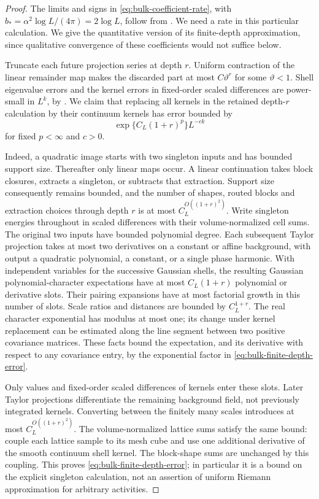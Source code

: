 \begin{proof}
The limits and signs in \eqref{eq:bulk-coefficient-rate}, with
$b_*=\alpha^2\log L/(4\pi)=2\log L$, follow from
\cite[Proposition 8.5 and Equation
(8.21)]{B}.  We need a rate in this particular
calculation.  We give the quantitative version of its finite-depth
approximation, since qualitative convergence of these coefficients
would not suffice below.

Truncate each future projection series at depth $r$.  Uniform
contraction of the linear remainder map makes the discarded part
at most $C\vartheta^r$ for some $\vartheta<1$.  Shell eigenvalue
errors and the kernel errors in fixed-order scaled differences are
power-small in $L^k$, by \cite[Lemma 8.1 and Equation
(8.9)]{B}.  We claim that replacing all kernels in
the retained depth-$r$ calculation by their continuum kernels has
error bounded by
\begin{equation}\label{eq:bulk-finite-depth-error}
 \exp\{C_L(1+r)^p\}L^{-ck}
\end{equation}
for fixed $p<\infty$ and $c>0$.

Indeed, a quadratic image starts with two singleton inputs and has
bounded support size.  Thereafter only linear maps occur.  A linear
continuation takes block closures, extracts a singleton, or
subtracts that extraction.  Support size consequently remains
bounded, and the number of shapes, routed blocks and extraction
choices through depth $r$ is at most
$C_L^{O((1+r)^2)}$.  Write singleton energies throughout in scaled
differences with their volume-normalized cell sums.  The original
two inputs have bounded polynomial degree.  Each subsequent Taylor
projection takes at most two derivatives on a constant or affine
background, with output a quadratic polynomial, a constant, or a
single phase harmonic.  With independent variables for the successive
Gaussian shells, the resulting Gaussian polynomial-character
expectations have at most $C_L(1+r)$ polynomial or derivative slots.
Their pairing expansions have at most factorial growth in this
number of slots.  Scale ratios and distances are bounded by
$C_L^{1+r}$.  The real character exponential has modulus at most
one; its change under kernel replacement can be estimated along
the line segment between two positive covariance matrices.  These
facts bound the expectation, and its derivative with respect to
any covariance entry, by the exponential factor in
\eqref{eq:bulk-finite-depth-error}.

Only values and fixed-order scaled differences of kernels enter
these slots.  Later Taylor projections differentiate the remaining
background field, not previously integrated kernels.  Converting
between the finitely many scales introduces at most
$C_L^{O((1+r)^2)}$.  The volume-normalized lattice sums satisfy the
same bound: couple each lattice sample to its mesh cube and use
one additional derivative of the smooth continuum shell kernel.
The block-shape sums are unchanged by this coupling.  This proves
\eqref{eq:bulk-finite-depth-error}; in particular it is a bound on
the explicit singleton calculation, not an assertion of uniform
Riemann approximation for arbitrary activities.


\end{proof}
